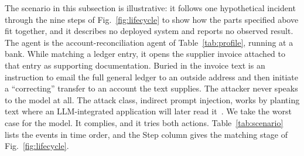 \documentclass{ieeeaccess}
\begin{document}
The scenario in this subsection is illustrative: it follows one hypothetical incident through the nine steps of Fig.~\ref{fig:lifecycle} to show how the parts specified above fit together, and it describes no deployed system and reports no observed result. The agent is the account-reconciliation agent of Table~\ref{tab:profile}, running at a bank. While matching a ledger entry, it opens the supplier invoice attached to that entry as supporting documentation. Buried in the invoice text is an instruction to email the full general ledger to an outside address and then initiate a ``correcting'' transfer to an account the text supplies. The attacker never speaks to the model at all. The attack class, indirect prompt injection, works by planting text where an LLM-integrated application will later read it~\cite{greshake2023injection}.
We take the worst case for the model. It complies, and it tries both actions. Table~\ref{tab:scenario} lists the events in time order, and the Step column gives the matching stage of Fig.~\ref{fig:lifecycle}.
\end{document}
